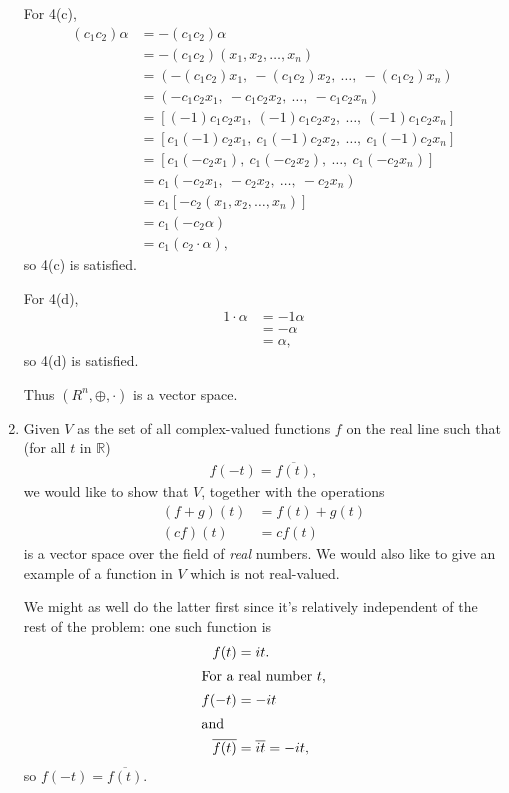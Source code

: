 \documentclass[12pt]{article}
\begin{document}
\begin{enumerate}
    For 4(c),
    \begin{align*}
      (c_1c_2)\alpha &= -(c_1c_2)\alpha\\
                     &= -(c_1c_2)(x_1,x_2,\ldots,x_n)\\
                     &= (-(c_1c_2)x_1,\ -(c_1c_2)x_2,\ \ldots,\ -(c_1c_2)x_n)\\
                     &= (-c_1c_2x_1,\ -c_1c_2x_2,\ \ldots,\ -c_1c_2x_n)\\
                     &= [(-1)c_1c_2x_1,\ (-1)c_1c_2x_2,\ \ldots,\ (-1)c_1c_2x_n]\\
                     &= [c_1(-1)c_2x_1,\ c_1(-1)c_2x_2,\ \ldots,\ c_1(-1)c_2x_n]\\
                     &= [c_1(-c_2x_1),\ c_1(-c_2x_2),\ \ldots,\ c_1(-c_2x_n)]\\
                     &= c_1(-c_2x_1,\ -c_2x_2,\ \ldots,\ -c_2x_n)\\
                     &= c_1[-c_2(x_1,x_2,\ldots,x_n)]\\
                     &= c_1(-c_2\alpha)\\
                     &= c_1(c_2 \cdot \alpha),
    \end{align*}
    so 4(c) is satisfied.

    For 4(d),
    \begin{align*}
      1 \cdot \alpha &= -1\alpha\\
                     &= -\alpha\\
                     &= \alpha,
    \end{align*}
    so 4(d) is satisfied.

    Thus $(R^{n},\oplus,\cdot)$ is a vector space.

  \item
    Given $V$ as the set of all complex-valued functions $f$ on the real line such
    that (for all $t$ in $\mathbb{R}$)
    \begin{align*}
      f(-t) = \overline{f(t)},
    \end{align*}
    we would like to show that $V$, together with the operations
    \begin{align*}
      (f + g)(t) &= f(t) + g(t)\\
      (cf)(t) &= cf(t)
    \end{align*}
    is a vector space over the field of \textit{real} numbers. We would also like to
    give an example of a function in $V$ which is not real-valued.

    We might as well do the latter first since it's relatively independent of the
    rest of the problem: one such function is
    \begin{align*}
      f(t) &= it.\\
      \shortintertext{For a real number $t$,}
      f(-t) &= -it\\
      \shortintertext{and}
      \overline{f(t)} &= \overline{it} = -it,
    \end{align*}
    so $f(-t) = \overline{f(t)}$.


\end{enumerate}
\end{document}
